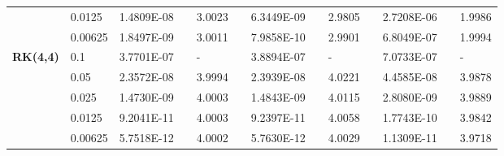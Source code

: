\documentclass[aspectratio=169]{beamer}
\numberwithin{theorem}{section} %
\begin{document}
\begin{frame}
\begin{table}[H]
\begin{tabular}{lllllrlrlrlrlrl}
		\multicolumn{2}{l}{} & \multicolumn{2}{l}{0.0125} & 1.4809E-08 &       & 3.0023  &       & 6.3449E-09 &       & 2.9805  &       & 2.7208E-06 &       & 1.9986  \\
		\multicolumn{2}{l}{} & \multicolumn{2}{l}{0.00625} & 1.8497E-09 &       & 3.0011  &       & 7.9858E-10 &       & 2.9901  &       & 6.8049E-07 &       & 1.9994  \\
		\multicolumn{2}{l}{\multirow{5}[1]{*}{\textbf{RK(4,4)}}} & \multicolumn{2}{l}{0.1} & 3.7701E-07 &       & -     &       & 3.8894E-07 &       & -     &       & 7.0733E-07 &       & - \\
		\multicolumn{2}{l}{} & \multicolumn{2}{l}{0.05} & 2.3572E-08 &       & 3.9994  &       & 2.3939E-08 &       & 4.0221  &       & 4.4585E-08 &       & 3.9878  \\
		\multicolumn{2}{l}{} & \multicolumn{2}{l}{0.025} & 1.4730E-09 &       & 4.0003  &       & 1.4843E-09 &       & 4.0115  &       & 2.8080E-09 &       & 3.9889  \\
		\multicolumn{2}{l}{} & \multicolumn{2}{l}{0.0125} & 9.2041E-11 &       & 4.0003  &       & 9.2397E-11 &       & 4.0058  &       & 1.7743E-10 &       & 3.9842  \\
		\multicolumn{2}{l}{} & \multicolumn{2}{l}{0.00625} & 5.7518E-12 &       & 4.0002  &       & 5.7630E-12 &       & 4.0029  &       & 1.1309E-11 &       & 3.9718  \\
		\bottomrule
		\end{tabular}%
		\label{tab_SAVRRK:6-1}%
		\end{table}%
\end{frame}
\end{document}

